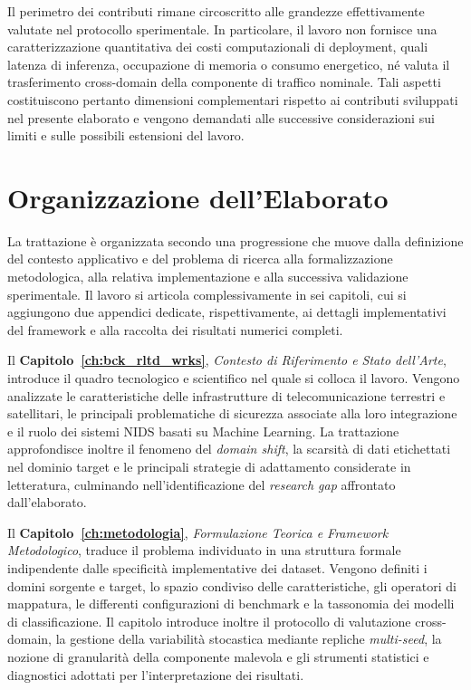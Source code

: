 Il perimetro dei contributi rimane circoscritto alle grandezze effettivamente valutate nel protocollo sperimentale. 
In particolare, il lavoro non fornisce una caratterizzazione quantitativa dei costi computazionali di deployment, quali latenza di inferenza, occupazione di memoria o consumo energetico, né valuta il trasferimento cross-domain della componente di traffico nominale. 
Tali aspetti costituiscono pertanto dimensioni complementari rispetto ai contributi sviluppati nel presente elaborato e vengono demandati alle successive considerazioni sui limiti e sulle possibili estensioni del lavoro.




\section{Organizzazione dell'Elaborato}
\label{sec:intro_organizzazione}

La trattazione è organizzata secondo una progressione che muove dalla definizione del contesto applicativo e del problema di ricerca alla formalizzazione metodologica, alla relativa implementazione e alla successiva validazione sperimentale. 
Il lavoro si articola complessivamente in sei capitoli, cui si aggiungono due appendici dedicate, rispettivamente, ai dettagli implementativi del framework e alla raccolta dei risultati numerici completi.

Il \textbf{Capitolo~\ref{ch:bck_rltd_wrks}}, \textit{Contesto di Riferimento e Stato dell'Arte}, introduce il quadro tecnologico e scientifico nel quale si colloca il lavoro. 
Vengono analizzate le caratteristiche delle infrastrutture di telecomunicazione terrestri e satellitari, le principali problematiche di sicurezza associate alla loro integrazione e il ruolo dei sistemi NIDS basati su Machine Learning. 
La trattazione approfondisce inoltre il fenomeno del \textit{domain shift}, la scarsità di dati etichettati nel dominio target e le principali strategie di adattamento considerate in letteratura, culminando nell'identificazione del \textit{research gap} affrontato dall'elaborato.

Il \textbf{Capitolo~\ref{ch:metodologia}}, \textit{Formulazione Teorica e Framework Metodologico}, traduce il problema individuato in una struttura formale indipendente dalle specificità implementative dei dataset. 
Vengono definiti i domini sorgente e target, lo spazio condiviso delle caratteristiche, gli operatori di mappatura, le differenti configurazioni di benchmark e la tassonomia dei modelli di classificazione. 
Il capitolo introduce inoltre il protocollo di valutazione cross-domain, la gestione della variabilità stocastica mediante repliche \textit{multi-seed}, la nozione di granularità della componente malevola e gli strumenti statistici e diagnostici adottati per l'interpretazione dei risultati.

